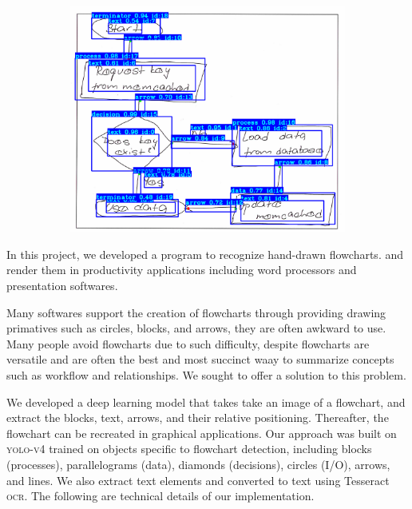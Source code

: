 \documentclass[10pt]{article}
\begin{document}
\begin{figure}[h]
\begin{subfigure}{0.28\columnwidth}
\end{subfigure}
\begin{subfigure}{0.28\columnwidth}
\includegraphics[width=\columnwidth]{sample.png}
\end{subfigure}
\end{figure}

In this project, we developed a program to recognize hand-drawn flowcharts.
and render them in productivity applications including word processors
and presentation softwares.

Many softwares support the creation of flowcharts through providing
drawing primatives such as circles, blocks, and arrows,
they are often awkward to use. Many people avoid flowcharts due to such
difficulty, despite flowcharts are versatile and are often the best and most
succinct waay to summarize concepts such as workflow
and relationships. We sought to offer a solution to this problem.

We developed a deep learning model that takes take an image
of a flowchart, and extract the blocks, text, arrows, and their relative
positioning.
Thereafter, the flowchart can be recreated in graphical applications.
Our approach was built on \textsc{yolo-v4}
trained on objects specific to flowchart
detection, including blocks (processes), parallelograms (data),
diamonds (decisions), circles (I/O), arrows, and lines.
We also extract text elements and converted to text using Tesseract
\textsc{ocr}. The following are technical details of our implementation.
\end{document}

